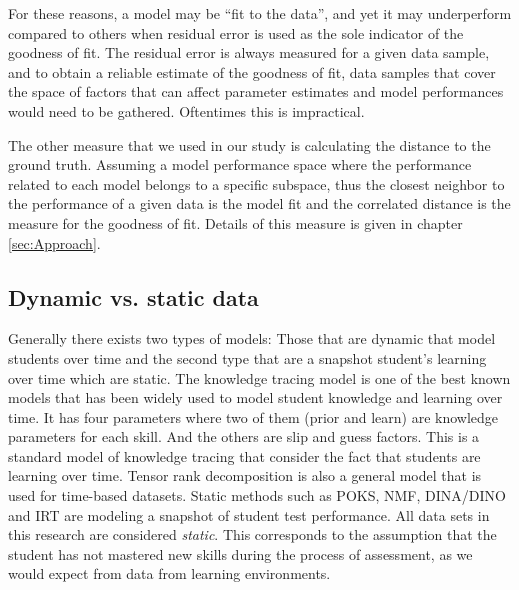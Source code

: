 For these reasons, a model may be ``fit to the data'', and yet it may underperform compared to others when residual error is used as the sole indicator of the goodness of fit.  The residual error is always measured for a given data sample, and to obtain a reliable estimate of the goodness of fit, data samples that cover the space of factors that can affect parameter estimates and model performances would need to be gathered.  Oftentimes this is impractical.

 The other measure that we used in our study is calculating the distance to the ground truth. Assuming a model performance space where the performance related to each model belongs to a specific subspace, thus the closest neighbor to the performance of a given data is the model fit and the correlated distance is the measure for the goodness of fit. Details of this measure is given in chapter \ref{sec:Approach}.





\subsection{Dynamic vs. static data}

Generally there exists two types of models: Those that are dynamic that model students over time and the second type that are a snapshot student's learning over time which are static. The knowledge tracing model \citep{corbett1994knowledge} is one of the best known models that has been widely used to model student knowledge and learning over time. It has four parameters where two of them (prior and learn) are knowledge parameters for each skill. And the others are slip and guess factors. This is a standard model of knowledge tracing that consider the fact that students are learning over time. Tensor rank decomposition is also a general model that is used for time-based datasets. Static methods such as POKS, NMF, DINA/DINO and IRT are modeling a snapshot of student test performance. All data sets in this research are considered \textit{static}.  This corresponds to the assumption that the student has not mastered new skills during the process of assessment, as we would expect from data from learning environments.

